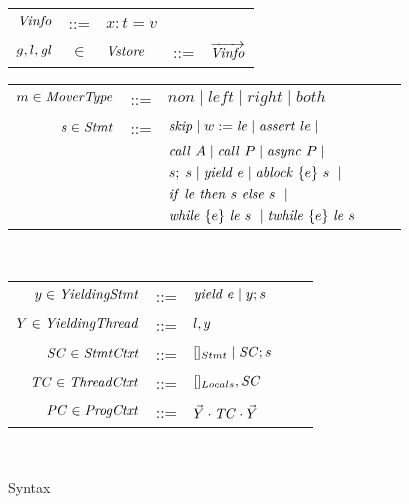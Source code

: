 \begin{figure}
\begin{tabular}{rclcl}
$\mathit{Vinfo}$ & ::= & $x:t=v$ \\
$g,l,\mathit{gl}$ & $\in$ & $\mathit{Vstore}$ & ::= & $\overrightarrow{\mathit{Vinfo}}$ \\
\end{tabular}
\begin{tabular}{rclcl}
$m \in \mathit{MoverType}$ &::= &$\mathit{non} \mid \mathit{left} \mid \mathit{right} \mid \mathit{both}$ \\
$\mathit{s} \in \mathit{Stmt}$ &::= & $\mathit{skip} \mid w := \mathit{le} \mid
\mathit{assert}\ le \mid $ \\
                  & & $\mathit{call}\ A \mid \mathit{call}\ P \mid \mathit{async}\ P \mid $\\
                  & & $s;\;s \mid \mathit{yield}\ e \mid \mathit{ablock}\ {\{e\}}\ {s}\  \mid$\\
                 & & ${\mathit{if}\ {\mathit{le}}\ }{\mathit{then}\ {s}\ }{\mathit{else}\ {s}\ } \mid$ \\
                  & & ${\mathit{while}\ {\{e\}}\ \mathit{le}}\ {s}\  \mid {\mathit{twhile}\ {\{e\}}\ \mathit{le}}\ {s}\ $
                  \\ 
\end{tabular}\\
\begin{tabular}{rclcl}
$y \in \mathit{YieldingStmt}$ &::= &$\mathit{yield}\ e \mid y;s$ \\
$Y \in \mathit{YieldingThread}$ &::= &$l, y$ \\
$\mathit{SC} \in \mathit{StmtCtxt}$ &::= &$[]_{Stmt} \mid \mathit{SC};s$ \\
$\mathit{TC} \in \mathit{ThreadCtxt}$ &::= &$[]_{Locals}, \mathit{SC}$ \\
$\mathit{PC} \in \mathit{ProgCtxt}$ &::= &$\vec{Y} \cdot \mathit{TC} \cdot \vec{Y}$ \\
\end{tabular}\\
\setlength{\tabcolsep}{6pt}
\caption{Syntax}
\label{fig:syntax}
\end{figure}


